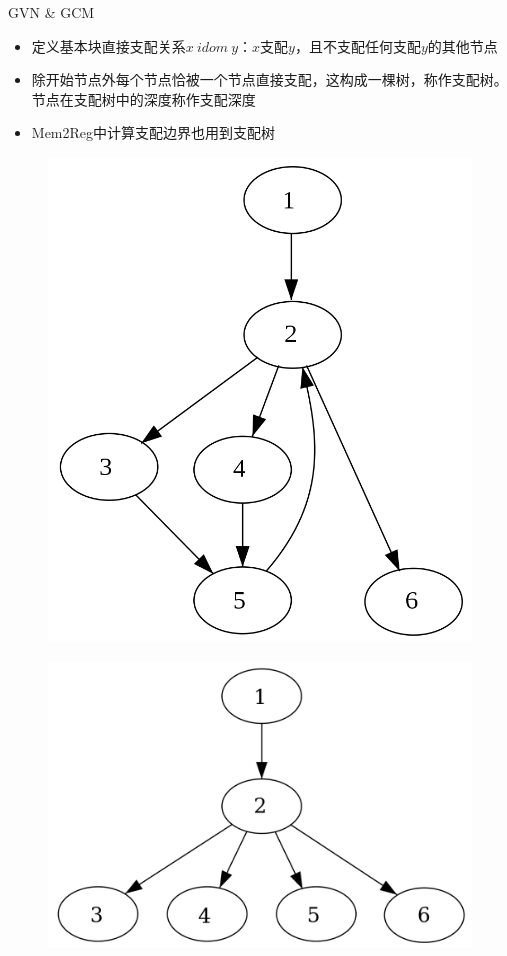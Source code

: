 \documentclass{beamer}
\begin{document}
\begin{frame}{GVN \& GCM}
\begin{itemize}
  \item 定义基本块直接支配关系$x\ idom\ y$：$x$支配$y$，且不支配任何支配$y$的其他节点
  \item 除开始节点外每个节点恰被一个节点直接支配，这构成一棵树，称作支配树。节点在支配树中的深度称作支配深度
  \item Mem2Reg中计算支配边界也用到支配树
\end{itemize}
\hspace{1cm}
\begin{minipage}{0.3\linewidth}
\begin{figure}[htpb]
  \includegraphics[width=1.0\linewidth]{pic/cfg.png}
\end{figure}
\end{minipage}\hspace{1cm}
\begin{minipage}{0.37\linewidth}
  \begin{figure}[htpb]
    \includegraphics[width=1.0\linewidth]{pic/dom_tree.png}

\end{figure}
\end{minipage}
\end{frame}
\end{document}
